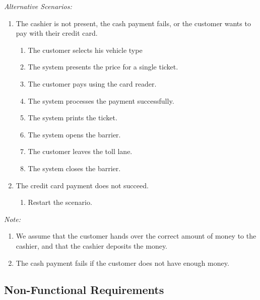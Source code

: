 \textit{Alternative Scenarios: }
\begin{enumerate}
	\item The cashier is not present, the cash payment fails, or the customer wants to pay with their credit card.
		\begin{enumerate}
			\item The customer selects his vehicle type
			\item The system presents the price for a single ticket.
			\item The customer pays using the card reader.
			\item The system processes the payment successfully.
			\item The system prints the ticket.
			\item The system opens the barrier.
			\item The customer leaves the toll lane.
			\item The system closes the barrier.
		\end{enumerate}
		
	\item The credit card payment does not succeed. 
		\begin{enumerate}
			\item Restart the scenario.
		\end{enumerate}

 \end{enumerate} 
 
 \textit{Note:} 
 \begin{enumerate}
 \item We assume that the customer hands over the correct amount of money to the cashier, and that the cashier deposits the money.
 \item The cash payment fails if the customer does not have enough money.
 \end{enumerate}


\subsection{Non-Functional Requirements}